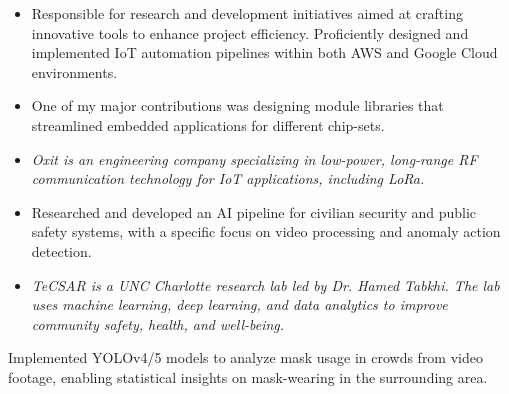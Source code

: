 \documentclass[10pt,letterpaper,ragged2e,withhyper]{altacv}
\begin{document}
\begin{paracol}{2}
  

\begin{itemize}
\item Responsible for research and development initiatives aimed at crafting innovative tools to enhance project efficiency. Proficiently designed and implemented IoT automation pipelines within both AWS and Google Cloud environments.
\item One of my major contributions was designing module libraries that streamlined embedded applications for different chip-sets.
\item \textit {Oxit is an engineering company specializing in low-power, long-range RF \newline communication technology for IoT applications, including LoRa.}
\end{itemize}

\divider

\begin{itemize}
\item Researched and developed an AI pipeline for civilian security and public safety systems, with a specific focus on video processing and anomaly action detection.
\item \textit{TeCSAR is a UNC Charlotte research lab led by Dr. Hamed Tabkhi. The lab uses machine learning, deep learning, and data analytics to improve \newline community safety, health, and well-being.}
\end{itemize}


\medskip


Implemented YOLOv4/5 models to analyze mask usage in crowds from video footage, enabling statistical insights on mask-wearing in the \newline surrounding area.


\end{paracol}
\end{document}
